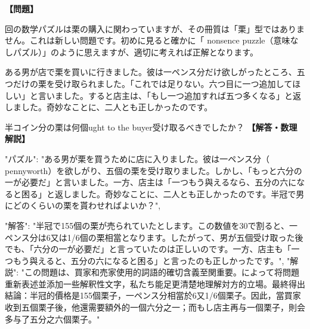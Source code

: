 \documentclass[10pt,a4paper,oneside,openany]{ltjsbook}
\begin{document}
\begin{tcolorbox}[colback=softblue,colframe=primaryblue,title=\textbf{第 37 問：BUYING CHESTNUTS.},arc=2mm,boxrule=1pt,breakable]
\textbf{【問題】}\par\vspace{0.3em}
回の数学パズルは栗の購入に関わっていますが、その冊質は「栗」型ではありません。これは新しい問題です。初めに見ると確かに「 nonsence puzzle（意味なしパズル）」のように思えますが、適切に考えれば正解となります。

ある男が店で栗を買いに行きました。彼は一ペンス分だけ欲しがったところ、五つだけの栗を受け取られました。「これでは足りない。六つ目に一つ追加してほしい」と言いました。すると店主は、「もし一つ追加すれば五つ多くなる」と返しました。奇妙なことに、二人とも正しかったのです。

半コイン分の栗は何個ught to the buyer受け取るべきでしたか？
\tcblower
\textbf{【解答・数理解説】}\par\vspace{0.3em}
{
"パズル": "ある男が栗を買うために店に入りました。彼は一ペンス分（ pennyworth）を欲しがり、五個の栗を受け取りました。しかし、「もっと六分の一が必要だ」と言いました。一方、店主は「一つもう與えるなら、五分の六になると困る」と返しました。奇妙なことに、二人とも正しかったのです。半冠で男にどのくらいの栗を貰わせればよいか？",

"解答": "半冠で155個の栗が売られていたとします。この数値を30で割ると、一ペンス分は6又は1/6個の栗相當となります。したがって、男が五個受け取った後でも、「六分の一が必要だ」と言っていたのは正しいのです。一方、店主も「一つもう與えると、五分の六になると困る」と言ったのも正しかったです。",
"解説": "この問題は、買家和売家使用的詞語的確切含義至関重要。によって将問題重新表述並添加一些解釈性文字，私たち能足更清楚地理解対方的立場。最終得出結論：半冠的價格是155個栗子，一ペンス分相當於6又1/6個栗子。因此，當買家收到五個栗子後，他還需要額外的一個六分之一；而もし店主再与一個栗子，則会多与了五分之六個栗子。"
}
\end{tcolorbox}
\end{document}
